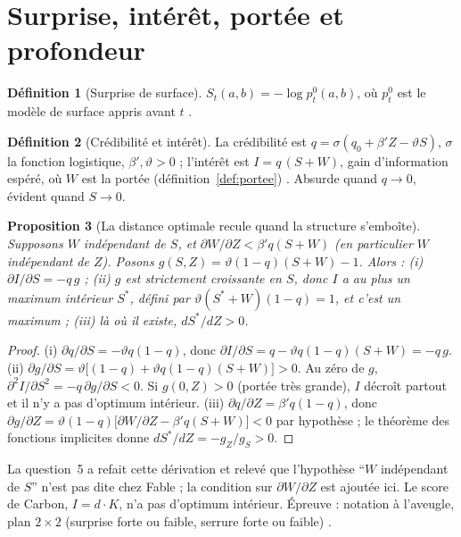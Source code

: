 \documentclass[11pt,a4paper]{article}
\theoremstyle{definition}
\newtheorem{definition}{Définition}[section]
\theoremstyle{plain}
\newtheorem{proposition}[definition]{Proposition}
\begin{document}
\section{Surprise, intérêt, portée et profondeur}
\label{sec:surprise}

\begin{definition}[Surprise de surface]
$S_t(a,b)=-\log p^0_t(a,b)$, où $p^0_t$ est le modèle de surface appris avant $t$
\cite[partie~2]{fable}.
\end{definition}

\begin{definition}[Crédibilité et intérêt]
\label{def:interet}
La crédibilité est $q=\sigma(q_0+\beta'Z-\vartheta S)$, $\sigma$ la fonction logistique,
$\beta',\vartheta>0$ ; l'intérêt est $I=q\,(S+W)$, gain d'information espéré, où $W$ est la portée
(définition~\ref{def:portee}) \cite[partie~2]{fable}. Absurde quand $q\to0$, évident quand $S\to0$.
\end{definition}

\begin{proposition}[La distance optimale recule quand la structure s'emboîte]
\label{prop:optimum}
Supposons $W$ indépendant de $S$, et $\partial W/\partial Z<\beta'q(S+W)$ (en particulier $W$
indépendant de $Z$). Posons $g(S,Z)=\vartheta(1-q)(S+W)-1$. Alors :
(i) $\partial I/\partial S=-q\,g$ ;
(ii) $g$ est strictement croissante en $S$, donc $I$ a au plus un maximum intérieur $S^\ast$, défini
par $\vartheta(S^\ast+W)(1-q)=1$, et c'est un maximum ;
(iii) là où il existe, $dS^\ast/dZ>0$.
\end{proposition}
\begin{proof}
(i) $\partial q/\partial S=-\vartheta q(1-q)$, donc $\partial I/\partial S=q-\vartheta q(1-q)(S+W)=-q\,g$.
(ii) $\partial g/\partial S=\vartheta\bigl[(1-q)+\vartheta q(1-q)(S+W)\bigr]>0$. Au zéro de $g$,
$\partial^2I/\partial S^2=-q\,\partial g/\partial S<0$. Si $g(0,Z)>0$ (portée très grande), $I$
décroît partout et il n'y a pas d'optimum intérieur.
(iii) $\partial q/\partial Z=\beta'q(1-q)$, donc
$\partial g/\partial Z=\vartheta(1-q)\bigl[\partial W/\partial Z-\beta'q(S+W)\bigr]<0$ par hypothèse ;
le théorème des fonctions implicites donne $dS^\ast/dZ=-g_Z/g_S>0$.
\end{proof}
La question~5 a refait cette dérivation et relevé que l'hypothèse \enquote{$W$ indépendant de $S$}
n'est pas dite chez Fable \cite[section~4, point~5]{q5} ; la condition sur $\partial W/\partial Z$
est ajoutée ici. Le score de Carbon, $I=d\cdot K$, n'a pas d'optimum intérieur. Épreuve : notation
à l'aveugle, plan $2\times2$ (surprise forte ou faible, serrure forte ou faible) \cite[section~4]{q7}.
\end{document}

